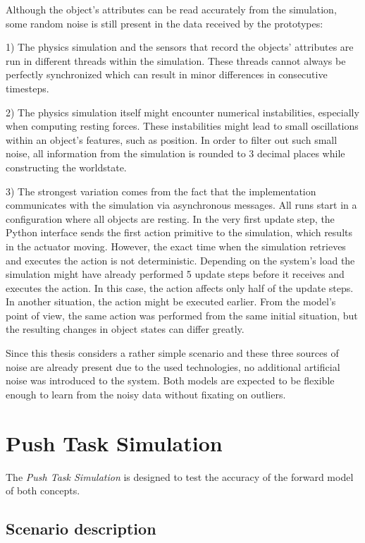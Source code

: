 Although the object's attributes can be read accurately from the simulation, some random noise is still present in the data received by the prototypes: 

1) The physics simulation and the sensors that record the objects' attributes are run in different threads within the simulation. These threads cannot always be perfectly synchronized which can result in minor differences in consecutive timesteps. 

2) The physics simulation itself might encounter numerical instabilities, especially when computing resting forces. These instabilities
might lead to small oscillations within an object's features, such as position. In order to filter out such small noise, all
information from the simulation is rounded to 3 decimal places while constructing the worldstate. 

3) The strongest variation comes from the fact that the implementation communicates with the simulation via asynchronous messages. 
All runs start in a configuration where all objects are resting. In the very first update step, the Python interface sends the first
action primitive to the simulation, which results in the actuator moving. However, the exact time when the simulation retrieves and executes
the action is not deterministic. Depending on the system's load the simulation might have already performed 5 update steps before
it receives and executes the action. In this case, the action affects only half of the update steps. In another situation, the action might
be executed earlier. From the model's point of view, the same action was performed from the same initial situation, but the resulting changes in object states can differ greatly. 

Since this thesis considers a rather simple scenario and these three sources of noise are already present due to the used technologies,
no additional artificial noise was introduced to the system. Both models are expected to be flexible enough to learn from the noisy data without
fixating on outliers.

\section{Push Task Simulation \label{sec:pushTaskSim}}

The \textit{Push Task Simulation} is designed to test the accuracy of the forward model of both concepts. 

\subsection{Scenario description}

